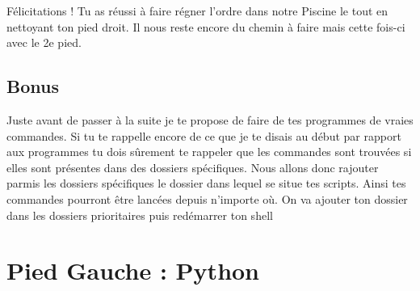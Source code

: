 \documentclass[a4paper, 12pt]{article}
\begin{document}
{    

    \vspace{15cm}


    Félicitations !
    Tu as réussi à faire régner l'ordre dans notre Piscine le tout en nettoyant ton pied droit.
    Il nous reste encore du chemin à faire mais cette fois-ci avec le 2e pied.

    \vspace{2cm}
    
    \subsection{Bonus}
    Juste avant de passer à la suite je te propose de faire de tes programmes de vraies commandes.
    Si tu te rappelle encore de ce que je te disais au début par rapport aux programmes
    tu dois sûrement te rappeler que les commandes sont trouvées si elles sont présentes dans des dossiers
    spécifiques. Nous allons donc rajouter parmis les dossiers spécifiques le dossier dans lequel se
    situe tes scripts. Ainsi tes commandes pourront être lancées depuis n'importe où.
    \newline \newline
    On va ajouter ton dossier dans les dossiers prioritaires puis redémarrer ton shell


    \vspace{4cm}
}


\section{Pied Gauche : Python}
\end{document}
